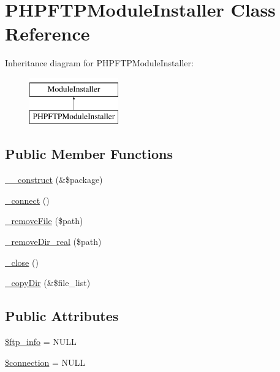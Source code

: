 \hypertarget{classPHPFTPModuleInstaller}{\section{P\-H\-P\-F\-T\-P\-Module\-Installer Class Reference}
\label{classPHPFTPModuleInstaller}
}
Inheritance diagram for P\-H\-P\-F\-T\-P\-Module\-Installer\-:\begin{figure}[H]
\begin{center}
\leavevmode
\includegraphics[height=2.000000cm]{classPHPFTPModuleInstaller}
\end{center}
\end{figure}
\subsection*{Public Member Functions}
\begin{DoxyCompactItemize}
\item 
\hyperlink{classPHPFTPModuleInstaller_a77b21801877b4ed19d4f1a3a30ebbf35}{\-\_\-\-\_\-construct} (\&\$package)
\item 
\hyperlink{classPHPFTPModuleInstaller_a17bd035c8cc7030a56feedf6562de616}{\-\_\-connect} ()
\item 
\hyperlink{classPHPFTPModuleInstaller_a6bfd41813d9f70b9e2ee06deb709742f}{\-\_\-remove\-File} (\$path)
\item 
\hyperlink{classPHPFTPModuleInstaller_abc79bfe0eea3d10f91672313cf8763c0}{\-\_\-remove\-Dir\-\_\-real} (\$path)
\item 
\hyperlink{classPHPFTPModuleInstaller_aa50f708fe4f367338fc95303e9425f83}{\-\_\-close} ()
\item 
\hyperlink{classPHPFTPModuleInstaller_ae9c696b9a99eea744500a23c2f30c81a}{\-\_\-copy\-Dir} (\&\$file\-\_\-list)
\end{DoxyCompactItemize}
\subsection*{Public Attributes}
\begin{DoxyCompactItemize}
\item 
\hyperlink{classPHPFTPModuleInstaller_abaa70235f6af643fc8d90fbecbc1892a}{\$ftp\-\_\-info} = N\-U\-L\-L
\item 
\hyperlink{classPHPFTPModuleInstaller_ab10c7e99865e2ba8ca058987dd81a986}{\$connection} = N\-U\-L\-L
\end{DoxyCompactItemize}


